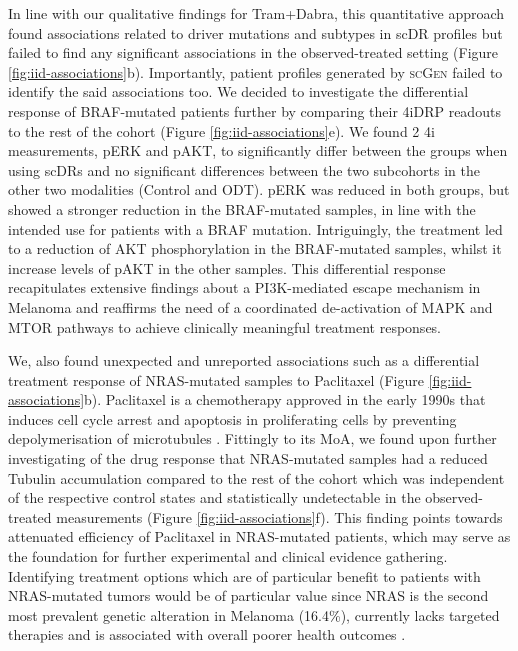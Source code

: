 In line with our qualitative findings for Tram+Dabra, this quantitative approach found associations related to driver mutations and subtypes in scDR profiles but failed to find any significant associations in the observed-treated setting (Figure \ref{fig:iid-associations}b).
 Importantly, patient profiles generated by \textsc{scGen} failed to identify the said associations too.
 We decided to investigate the differential response of BRAF-mutated patients further by comparing their 4iDRP readouts to the rest of the cohort (Figure \ref{fig:iid-associations}e).
 We found 2 4i measurements, pERK and pAKT, to significantly differ between the groups when using scDRs and no significant differences between the two subcohorts in the other two modalities (Control and ODT).
 pERK was reduced in both groups, but showed a stronger reduction in the BRAF-mutated samples, in line with the intended use for patients with a BRAF mutation.
 Intriguingly, the treatment led to a reduction of AKT phosphorylation in the BRAF-mutated samples, whilst it increase levels of pAKT in the other samples.
 This differential response recapitulates extensive findings about a PI3K-mediated escape mechanism in Melanoma \cite{penna2015,irvine2018} and reaffirms the need of a coordinated de-activation of MAPK and MTOR pathways to achieve clinically meaningful treatment responses. 

We, also found unexpected and unreported associations such as a differential treatment response of NRAS-mutated samples to Paclitaxel (Figure \ref{fig:iid-associations}b).
 Paclitaxel is a chemotherapy approved in the early 1990s that induces cell cycle arrest and apoptosis in proliferating cells by preventing depolymerisation of microtubules \cite{panchagnula1998}.
 Fittingly to its MoA, we found upon further investigating of the drug response that NRAS-mutated samples had a reduced Tubulin accumulation compared to the rest of the cohort which was independent of the respective control states and statistically undetectable in the observed-treated measurements (Figure \ref{fig:iid-associations}f).
 This finding points towards attenuated efficiency of Paclitaxel in NRAS-mutated patients, which may serve as the foundation for further experimental and clinical evidence gathering.
 Identifying treatment options which are of particular benefit to patients with NRAS-mutated tumors would be of particular value since NRAS is the second most prevalent genetic alteration in Melanoma (16.4\%), currently lacks targeted therapies and is associated with overall poorer health outcomes \cite{gutierrez-castaneda2020}. 

